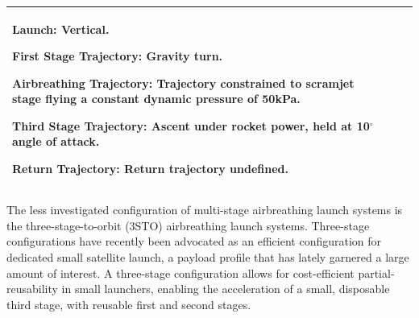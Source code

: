 {\begin{landscape}
\begin{xltabular}{\linewidth}{|X|X|X|}
	
	\textbf{Launch:} Vertical.
	
	\textbf{First Stage Trajectory:} Gravity turn. 
	
	\textbf{Airbreathing Trajectory:} Trajectory constrained to scramjet stage flying a constant dynamic pressure of 50kPa. 
	
	\textbf{Third Stage Trajectory:} Ascent under rocket power, held at 10$^\circ$ angle of attack. 
	
	\textbf{Return Trajectory:} Return trajectory undefined. 
	
	\\
	\hline
\end{xltabular}

\end{landscape}
}
\noindent
The less investigated configuration of multi-stage airbreathing launch systems is the three-stage-to-orbit (3STO) airbreathing launch systems. Three-stage configurations have recently been advocated as an efficient configuration for dedicated small satellite launch, a payload profile that has lately garnered a large amount of interest\cite{Preller2017b,Faa&Ast&Comstac2015}. A three-stage configuration allows for cost-efficient partial-reusability in small launchers, enabling the acceleration of a small, disposable third stage, with reusable first and second stages\cite{Preller2017b,Kimura1999}. 
